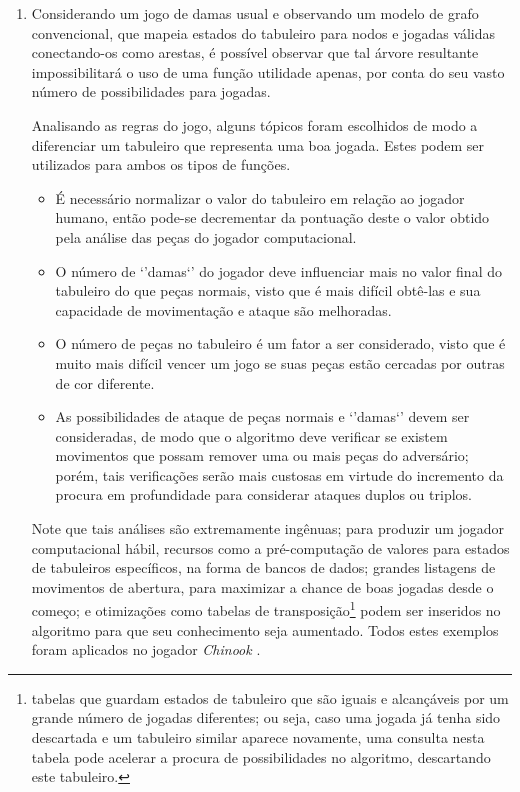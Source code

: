 \documentclass{article}
\begin{document}
\begin{enumerate}[label=\textbf{\arabic*})]
\begin{tikzpicture}[sibling distance=-2pt]
    \end{tikzpicture}

    \item Considerando um jogo de damas usual e observando um modelo de grafo
    convencional, que mapeia estados do tabuleiro para nodos e jogadas válidas
    conectando-os como arestas, é possível observar que tal árvore resultante
    impossibilitará o uso de uma função utilidade apenas, por conta do seu
    vasto número de possibilidades para jogadas.

    Analisando as regras do jogo, alguns tópicos foram escolhidos de modo a
    diferenciar um tabuleiro que representa uma boa jogada. Estes podem ser
    utilizados para ambos os tipos de funções.

    \begin{itemize}

        \item É necessário normalizar o valor do tabuleiro em relação ao
        jogador humano, então pode-se decrementar da pontuação deste o valor
        obtido pela análise das peças do jogador computacional.

        \item O número de `'damas`' do jogador deve influenciar mais no valor
        final do tabuleiro do que peças normais, visto que é mais difícil
        obtê-las e sua capacidade de movimentação e ataque são melhoradas.

        \item O número de peças no tabuleiro é um fator a ser considerado,
        visto que é muito mais difícil vencer um jogo se suas peças estão
        cercadas por outras de cor diferente.

        \item As possibilidades de ataque de peças normais e `'damas`' devem
        ser consideradas, de modo que o algoritmo deve verificar se existem
        movimentos que possam remover uma ou mais peças do adversário; porém,
        tais verificações serão mais custosas em virtude do incremento da
        procura em profundidade para considerar ataques duplos ou triplos.

    \end{itemize}

    Note que tais análises são extremamente ingênuas; para produzir um
    jogador computacional hábil, recursos como a pré-computação de valores
    para estados de tabuleiros específicos, na forma de bancos de dados;
    grandes listagens de movimentos de abertura, para maximizar a chance de
    boas jogadas desde o começo; e otimizações como tabelas de
    transposição\footnote{tabelas que guardam estados de tabuleiro que são
    iguais e alcançáveis por um grande número de jogadas diferentes;
    ou seja, caso uma jogada já tenha sido descartada e um tabuleiro similar
    aparece novamente, uma consulta nesta tabela pode acelerar a procura de
    possibilidades no algoritmo, descartando este tabuleiro.} podem ser
    inseridos no algoritmo para que seu conhecimento seja aumentado.
    Todos estes exemplos foram aplicados no jogador \textit{Chinook}
    \cite{Schaeffer1989}.


\end{enumerate}
\end{document}
